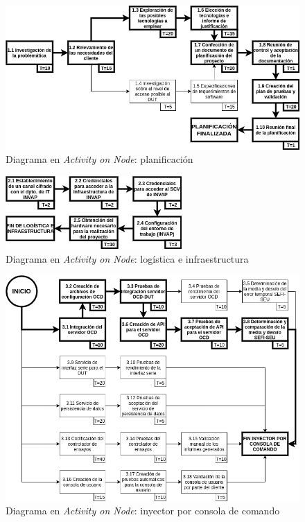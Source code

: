 \documentclass[
11pt, %
]{charter}
\begin{document}
\begin{figure}[htpb]
	\centering 
	\includegraphics[width=\textwidth]{./Figuras/AoN1.png}
	\caption{Diagrama en \textit{Activity on Node}: planificación}
	\label{fig:AoN1}
\end{figure}

\begin{figure}[htpb]
	\centering 
	\includegraphics[width=0.6\textwidth]{./Figuras/AoN2.png}
	\caption{Diagrama en \textit{Activity on Node}: logística e infraestructura}
	\label{fig:AoN2}
\end{figure}

\begin{figure}[htpb]
	\centering 
	\includegraphics[width=\textwidth]{./Figuras/AoN3.png}
	\caption{Diagrama en \textit{Activity on Node}: inyector por consola de comando}
	\label{fig:AoN3}
\end{figure}
\end{document}
